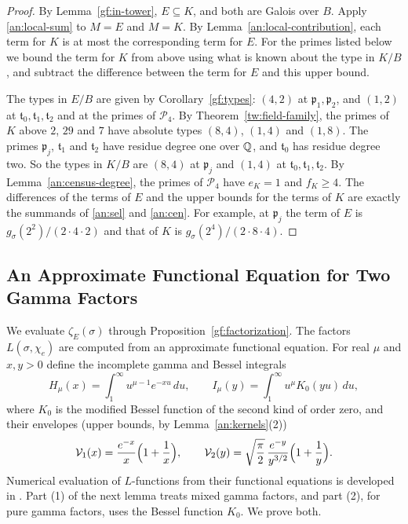 \begin{proof}
By Lemma~\ref{gf:in-tower}, $E\subseteq K$, and both are Galois over $B$.
Apply \eqref{an:local-sum} to $M=E$ and $M=K$. By
Lemma~\ref{an:local-contribution}, each term for $K$ is at most the
corresponding term for $E$. For the primes listed below we bound the term
for $K$ from above using what is known about the type in $K/B$, and
subtract the difference between the term for $E$ and this upper bound.

The types in $E/B$ are given by Corollary~\ref{gf:types}: $(4,2)$ at
$\mathfrak p_1,\mathfrak p_2$, and $(1,2)$ at $\mathfrak t_0,\mathfrak
t_1,\mathfrak t_2$ and at the primes of $\mathcal P_4$. By
Theorem~\ref{tw:field-family}, the primes of $K$ above $2$, $29$ and $7$ have
absolute types $(8,4)$, $(1,4)$ and $(1,8)$. The primes $\mathfrak p_j$,
$\mathfrak t_1$ and $\mathfrak t_2$ have residue degree one over $\mathbb Q$, and
$\mathfrak t_0$ has residue degree two. So the types in $K/B$ are $(8,4)$ at
$\mathfrak p_j$ and $(1,4)$ at $\mathfrak t_0,\mathfrak t_1,\mathfrak t_2$.
By Lemma~\ref{an:census-degree}, the primes of $\mathcal P_4$ have $e_K=1$
and $f_K\ge4$. The differences of the terms of $E$ and the upper bounds for
the terms of $K$ are exactly the summands of \eqref{an:sel} and
\eqref{an:cen}. For example, at $\mathfrak p_j$ the term of $E$ is
$g_\sigma(2^2)/(2\cdot4\cdot2)$ and that of $K$ is
$g_\sigma(2^4)/(2\cdot8\cdot4)$.
\end{proof}

\subsection{An Approximate Functional Equation for Two Gamma Factors}
\label{an:afe-section}
We evaluate $\zeta_E(\sigma)$ through Proposition~\ref{gf:factorization}. The
factors $L(\sigma,\chi_e)$ are computed from an approximate functional
equation. For real $\mu$ and $x,y>0$ define the incomplete gamma and Bessel
integrals
\[
 H_\mu(x)=\int_1^\infty u^{\mu-1}e^{-xu}\,du,\qquad
 I_\mu(y)=\int_1^\infty u^\mu K_0(yu)\,du,
\]
where $K_0$ is the modified Bessel function of the second kind of order
zero, and their envelopes (upper bounds, by Lemma~\ref{an:kernels}(2))
\[
 \mathcal V_1(x)=\frac{e^{-x}}x\Bigl(1+\frac1x\Bigr),\qquad
 \mathcal V_2(y)=\sqrt{\frac\pi2}\,\frac{e^{-y}}{y^{3/2}}\Bigl(1+\frac1y\Bigr).
\]
Numerical evaluation of $L$-functions from their functional equations is
developed in \cite{Dokchitser2004}. Part (1) of the next lemma treats mixed
gamma factors, and part (2), for pure gamma factors, uses the Bessel
function $K_0$. We prove both.

